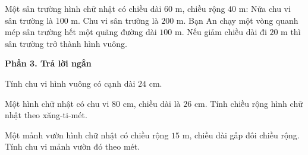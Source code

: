\begin{ex} %
Một sân trường hình chữ nhật có chiều dài $60\text{ m}$, chiều rộng $40\text{ m}$:
\choiceTF
{\True Nửa chu vi sân trường là $100\text{ m}$.}
{\True Chu vi sân trường là $200\text{ m}$.}
{Bạn An chạy một vòng quanh mép sân trường hết một quãng đường dài $100\text{ m}$.}
{\True Nếu giảm chiều dài đi $20\text{ m}$ thì sân trường trở thành hình vuông.}
\end{ex}

\textbf{Phần 3. Trả lời ngắn}

\begin{ex} %
Tính chu vi hình vuông có cạnh dài $24\text{ cm}$.
\end{ex}

\begin{ex} %
Một hình chữ nhật có chu vi $80\text{ cm}$, chiều dài là $26\text{ cm}$. Tính chiều rộng hình chữ nhật theo xăng-ti-mét.
\end{ex}

\begin{ex} %
Một mảnh vườn hình chữ nhật có chiều rộng $15\text{ m}$, chiều dài gấp đôi chiều rộng. Tính chu vi mảnh vườn đó theo mét.
\end{ex}

